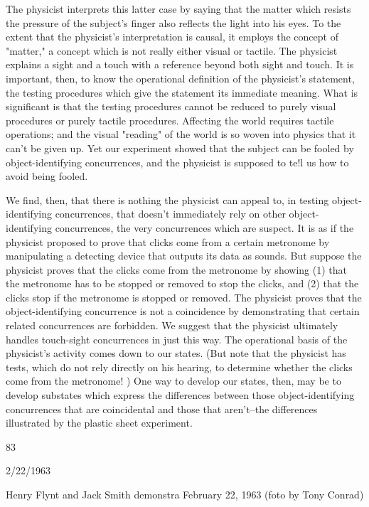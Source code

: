 \documentclass[10pt,twoside]{memoir}
\begin{document}
\begin{enumerate}
{{{{{{{{{{{{{{{{The physicist interprets this latter case by saying that the matter which 
resists the pressure of the subject's finger also reflects the light into his eyes. 
To the extent that the physicist's interpretation is causal, it employs the 
concept of "matter," a concept which is not really either visual or tactile. 
The physicist explains a sight and a touch with a reference beyond both sight 
and touch. It is important, then, to know the operational definition of the 
physicist's statement, the testing procedures which give the statement its 
immediate meaning. What is significant is that the testing procedures cannot 
be reduced to purely visual procedures or purely tactile procedures. 
Affecting the world requires tactile operations; and the visual "reading" of 
the world is so woven into physics that it can't be given up. Yet our 
experiment showed that the subject can be fooled by object-identifying 
concurrences, and the physicist is supposed to te!l us how to avoid being 
fooled. 

We find, then, that there is nothing the physicist can appeal to, in 
testing object-identifying concurrences, that doesn't immediately rely on 
other object-identifying concurrences, the very concurrences which are 
suspect. It is as if the physicist proposed to prove that clicks come from a 
certain metronome by manipulating a detecting device that outputs its data 
as sounds. But suppose the physicist proves that the clicks come from the 
metronome by showing (1) that the metronome has to be stopped or 
removed to stop the clicks, and (2) that the clicks stop if the metronome is 
stopped or removed. The physicist proves that the object-identifying 
concurrence is not a coincidence by demonstrating that certain related 
concurrences are forbidden. We suggest that the physicist ultimately handles 
touch-sight concurrences in just this way. The operational basis of the 
physicist's activity comes down to our states. (But note that the physicist 
has tests, which do not rely directly on his hearing, to determine whether the 
clicks come from the metronome! ) One way to develop our states, then, 
may be to develop substates which express the differences between those 
object-identifying concurrences that are coincidental and those that 
aren't--the differences illustrated by the plastic sheet experiment. 


83 


2/22/1963 


Henry Flynt and Jack Smith demonstra 
February 22, 1963 
(foto by Tony Conrad) 


}}}}}}}}}}}}}}}}
\end{enumerate}
\end{document}
